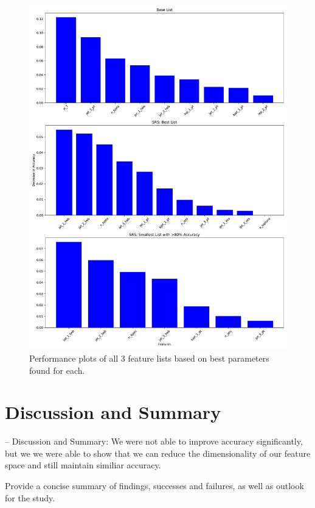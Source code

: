 \documentclass[]{article}
\begin{document}
\begin{figure}[ht]
	\centering
	\includegraphics[width=\linewidth]{best_model/feature_importances.pdf}
	\caption{Performance plots of all 3 feature lists based on best parameters found for each.}
	\label{fig:best_models_feature_ranking}
\end{figure}



\clearpage
\section{Discussion and Summary}
– Discussion and Summary:
We were not able to improve accuracy significantly, but we we were able to show that we can reduce the dimensionality of our feature space and still maintain similiar accuracy.



Provide a concise summary of findings, successes and failures, as well as outlook for the
study.
\end{document}
